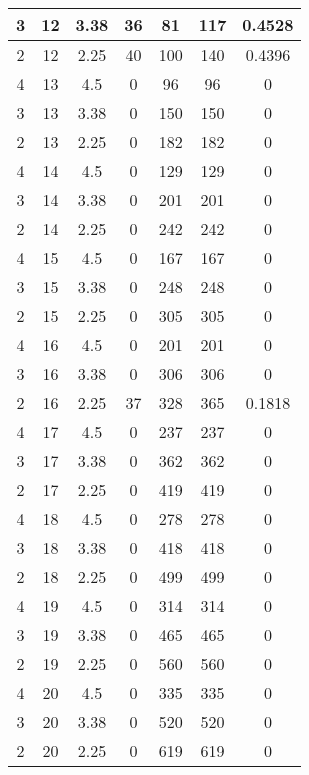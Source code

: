 \documentclass[letterpaper, 12pt]{article}
\begin{document}
\begin{longtable}{|c|c|c|c|c|c|c|}
\hline
3 & 12 & 3.38 & 36 & 81 & 117 & 0.4528 \\
\hline
2 & 12 & 2.25 & 40 & 100 & 140 & 0.4396 \\
\hline
4 & 13 & 4.5 & 0 & 96 & 96 & 0 \\
\hline
3 & 13 & 3.38 & 0 & 150 & 150 & 0 \\
\hline
2 & 13 & 2.25 & 0 & 182 & 182 & 0 \\
\hline
4 & 14 & 4.5 & 0 & 129 & 129 & 0 \\
\hline
3 & 14 & 3.38 & 0 & 201 & 201 & 0 \\
\hline
2 & 14 & 2.25 & 0 & 242 & 242 & 0 \\
\hline
4 & 15 & 4.5 & 0 & 167 & 167 & 0 \\
\hline
3 & 15 & 3.38 & 0 & 248 & 248 & 0 \\
\hline
2 & 15 & 2.25 & 0 & 305 & 305 & 0 \\
\hline
4 & 16 & 4.5 & 0 & 201 & 201 & 0 \\
\hline
3 & 16 & 3.38 & 0 & 306 & 306 & 0 \\
\hline
2 & 16 & 2.25 & 37 & 328 & 365 & 0.1818 \\
\hline
4 & 17 & 4.5 & 0 & 237 & 237 & 0 \\
\hline
3 & 17 & 3.38 & 0 & 362 & 362 & 0 \\
\hline
2 & 17 & 2.25 & 0 & 419 & 419 & 0 \\
\hline
4 & 18 & 4.5 & 0 & 278 & 278 & 0 \\
\hline
3 & 18 & 3.38 & 0 & 418 & 418 & 0 \\
\hline
2 & 18 & 2.25 & 0 & 499 & 499 & 0 \\
\hline
4 & 19 & 4.5 & 0 & 314 & 314 & 0 \\
\hline
3 & 19 & 3.38 & 0 & 465 & 465 & 0 \\
\hline
2 & 19 & 2.25 & 0 & 560 & 560 & 0 \\
\hline
4 & 20 & 4.5 & 0 & 335 & 335 & 0 \\
\hline
3 & 20 & 3.38 & 0 & 520 & 520 & 0 \\
\hline
2 & 20 & 2.25 & 0 & 619 & 619 & 0 \\
\hline
\end{longtable}
\end{document}
